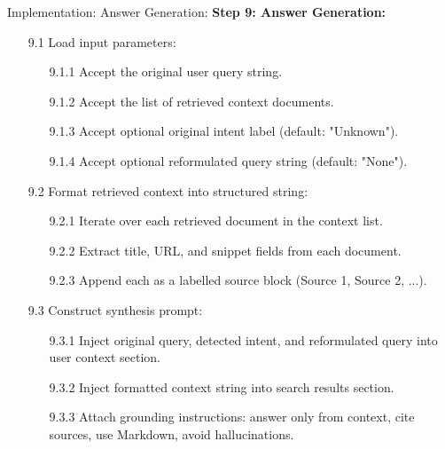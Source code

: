\begin{frame}{Implementation: Answer Generation:}
    \textbf{Step 9: Answer Generation:}
    \begin{itemize}
        \item[9.1] Load input parameters:
        \begin{itemize}
                  \item[9.1.1] Accept the original user query string.
                  \item[9.1.2] Accept the list of retrieved context documents.
                  \item[9.1.3] Accept optional original intent label (default: "Unknown").
                  \item[9.1.4] Accept optional reformulated query string (default: "None").
        \end{itemize}

        \item[9.2] Format retrieved context into structured string:
        \begin{itemize}
                  \item[9.2.1] Iterate over each retrieved document in the context list.
                  \item[9.2.2] Extract title, URL, and snippet fields from each document.
                  \item[9.2.3] Append each as a labelled source block (Source 1, Source 2, ...).
        \end{itemize}

        \item[9.3] Construct synthesis prompt:
        \begin{itemize}
                  \item[9.3.1] Inject original query, detected intent, and reformulated query into user context section.
                  \item[9.3.2] Inject formatted context string into search results section.
                  \item[9.3.3] Attach grounding instructions: answer only from context, cite sources, use Markdown, avoid hallucinations.
        \end{itemize}
        
    \end{itemize}
\end{frame}

